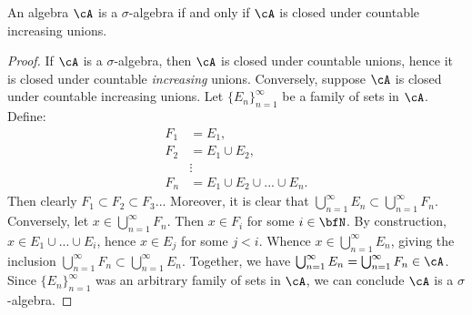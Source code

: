 \documentclass[10pt,twoside,openany]{memoir}
\begin{document}
\begin{exercise}
    An algebra $\cA$ is a $\sigma$-algebra if and only if $\cA$ is closed under countable increasing unions.
\end{exercise}
    {\color{blue} \begin{proof}
        If $\cA$ is a $\sigma$-algebra, then $\cA$ is closed under countable unions, hence it is closed under countable \textit{increasing} unions. Conversely, suppose $\cA$ is closed under countable increasing unions. Let $\{E_n\}_{n = 1}^\infty$ be a family of sets in $\cA$. Define:
            \begin{equation*}
            \begin{split}
                F_1 &= E_1, \\
                F_2 &= E_1 \cup E_2, \\
                &\vdots \\
                F_n &= E_1 \cup E_2 \cup ... \cup E_n.
            \end{split}
            \end{equation*}
        Then clearly $F_1 \subset F_2 \subset F_3 ...$ Moreover, it is clear that $\bigcup_{n = 1}^\infty E_n \subset \bigcup_{n = 1}^\infty F_n$. Conversely, let $x \in \bigcup_{n = 1}^\infty F_n$. Then $x \in F_i$ for some $i \in \bfN$. By construction, $x \in E_1 \cup ... \cup E_i$, hence $x \in E_j$ for some $j < i$. Whence $x \in \bigcup_{n=1}^\infty E_n$, giving the inclusion $\bigcup_{n = 1}^\infty F_n \subset \bigcup_{n = 1}^\infty E_n$. Together, we have  $\bigcup_{n = 1}^\infty E_n = \bigcup_{n = 1}^\infty F_n \in \cA$. Since $\{E_n\}_{n = 1}^\infty$ was an arbitrary family of sets in $\cA$, we can conclude $\cA$ is a $\sigma$-algebra.
    \end{proof}}
\end{document}
